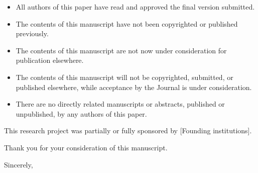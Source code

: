 \documentclass[11pt]{Unicampletter}
\begin{document}
\begin{letter}{
		    }
\begin{itemize}
	   \item All authors of this paper have read and approved the final version submitted.
	        
	   \item The contents of this manuscript have not been copyrighted or published previously.
	        
	   \item The contents of this manuscript are not now under consideration for publication elsewhere.
	        
	   \item The contents of this manuscript will not be copyrighted, submitted, or published elsewhere, while acceptance by the Journal is under consideration.
	        
	   \item There are no directly related manuscripts or abstracts, published or unpublished, by any authors of this paper.
	        
	\end{itemize}
	    
	This research project was partially or fully sponsored by [Founding institutions].
	    
	    \vspace{10mm}
	    
		Thank you for your consideration of this manuscript. 
		
		\vspace{5mm}
	
	
  		
  		
		
		
		\closing{Sincerely,}
		
		
		
		
	\end{letter}
	
\end{document}
